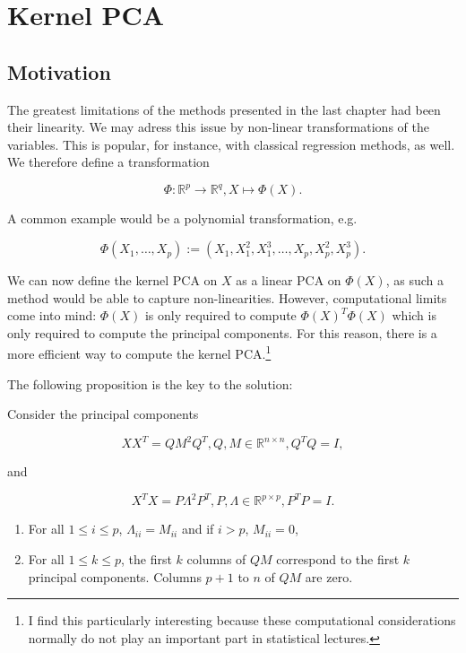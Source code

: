 \documentclass[]{report}
\providecommand{\tightlist}{%
  \setlength{\itemsep}{0pt}\setlength{\parskip}{0pt}}
\let\rmarkdownfootnote\footnote%
\def\footnote{\protect\rmarkdownfootnote}
\theoremstyle{definition}
\theoremstyle{definition}
\theoremstyle{definition}
\theoremstyle{remark}
\let\BeginKnitrBlock\begin \let\EndKnitrBlock\end
\begin{document}
\hypertarget{kernel-pca}{%
\section{Kernel PCA}\label{kernel-pca}}

\hypertarget{motivation-2}{%
\subsection{Motivation}\label{motivation-2}}

The greatest limitations of the methods presented in the last chapter
had been their linearity. We may adress this issue by non-linear
transformations of the variables. This is popular, for instance, with
classical regression methods, as well. We therefore define a
transformation

\[
\Phi: \mathbb{R}^p\to \mathbb{R}^q, X\mapsto \Phi(X).
\]

\BeginKnitrBlock{example}
\protect\hypertarget{exm:unnamed-chunk-7}{}{\label{exm:unnamed-chunk-7} }A
common example would be a polynomial transformation, e.g.

\[
  \Phi(X_1,\dotsc, X_p):=(X_1,X_1^2,X_1^3,\dotsc, X_p, X_p^2, X_p^3).
  \]
\EndKnitrBlock{example}

We can now define the kernel PCA on \(X\) as a linear PCA on
\(\Phi(X)\), as such a method would be able to capture non-linearities.
However, computational limits come into mind: \(\Phi(X)\) is only
required to compute \(\Phi(X)^T\Phi(X)\) which is only required to
compute the principal components. For this reason, there is a more
efficient way to compute the kernel PCA.\footnote{I find this
  particularly interesting because these computational considerations
  normally do not play an important part in statistical lectures.}

The following proposition is the key to the solution:

\BeginKnitrBlock{proposition}
\protect\hypertarget{prp:unnamed-chunk-8}{}{\label{prp:unnamed-chunk-8}
}Consider the principal components

\[
  XX^T=QM^2Q^T, Q,M\in\mathbb{R}^{n\times n}, Q^TQ=I,
\]

and

\[
  X^TX=P\Lambda^2P^T, P,\Lambda\in\mathbb{R}^{p\times p}, P^TP=I.
\]

\begin{enumerate}
\def\labelenumi{\arabic{enumi}.}
\tightlist
\item
  For all \(1\le i\le p\), \(\Lambda_{ii}=M_{ii}\) and if \(i>p\),
  \(M_{ii}=0\),
\item
  For all \(1\le k\le p\), the first \(k\) columns of \(QM\) correspond
  to the first \(k\) principal components. Columns \(p+1\) to \(n\) of
  \(QM\) are zero.
\end{enumerate}
\EndKnitrBlock{proposition}
\end{document}
